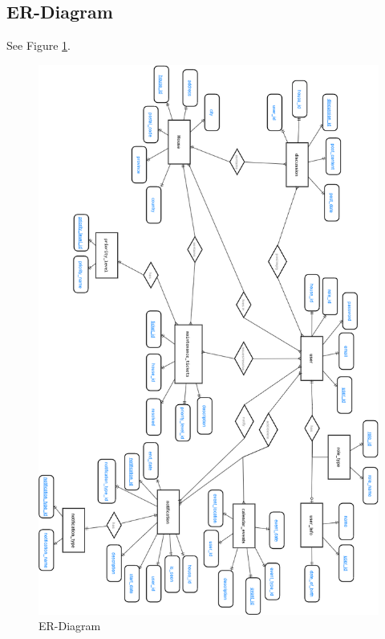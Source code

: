 \documentclass[12pt]{article}
\begin{document}
\subsection{ER-Diagram}
See Figure \ref{fig:er}.
\begin{figure}[h]
  \includegraphics[scale=0.5, keepaspectratio]{images/ER_Diagram.png}
  \caption{ER-Diagram}
  \label{fig:er}
\end{figure}
\end{document}
